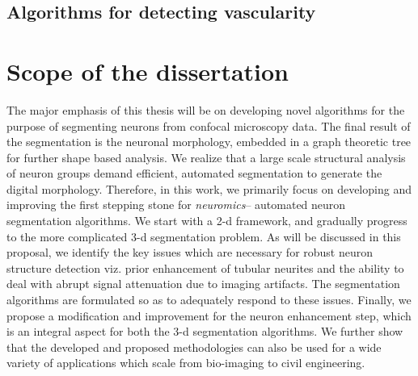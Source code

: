\subsection{Algorithms for detecting vascularity}

\section{Scope of the dissertation}
The major emphasis of this thesis will be on developing novel  algorithms for the purpose of segmenting neurons from confocal microscopy data. The final result of the segmentation is the neuronal morphology, embedded in a graph theoretic tree for further shape based analysis. We realize that a large scale structural analysis of neuron groups demand efficient, automated segmentation to generate the digital morphology. Therefore, in this work, we primarily focus on developing and improving the first stepping stone for \textit{neuromics}-- automated neuron segmentation algorithms. We start with a 2-d framework, and gradually progress to the more complicated 3-d segmentation problem. As will be discussed in this proposal, we identify the key issues which are necessary for robust neuron structure detection viz. prior enhancement of tubular neurites and the ability to deal with abrupt signal attenuation due to imaging artifacts. The segmentation algorithms are formulated so as to adequately respond to these issues. Finally, we propose a modification and improvement for the neuron enhancement step, which is an integral aspect for both the 3-d segmentation algorithms. We further show that the developed and proposed methodologies can also be used for a wide variety of applications which scale from bio-imaging to civil engineering. 
